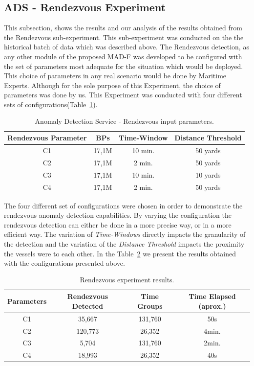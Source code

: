 \subsection{ADS - Rendezvous Experiment}
\label{subsection: ADS - Rendezvous Experiment}
This subsection, shows the results and our analysis of the results obtained from the Rendezvous sub-experiment. This sub-experiment was conducted on the the historical batch of data which was described above. The Rendezvous detection, as any other module of the proposed MAD-F was developed to be configured with the set of parameters most adequate for the situation which would be deployed. This choice of parameters in any real scenario would be done by Maritime Experts. Although for the sole purpose of this Experiment, the choice of parameters was done by us. This Experiment was conducted with four different sets of configurations(Table~\ref{Table: 5 ADS Rendezvous input paramenters}).

\begin{table}[H]
\centering
\caption{Anomaly Detection Service - Rendezvous input parameters.}
\label{Table: 5 ADS Rendezvous input paramenters}
\begin{tabular}{@{}cccc@{}}
\toprule
Rendezvous Parameter & BPs & Time-Window & Distance Threshold \\ \midrule
C1 & 17,1M & 10 min. & 50 yards \\
C2 & 17,1M & 2 min. & 50 yards \\
C3 & 17,1M & 10 min. & 10 yards \\
C4 & 17,1M & 2 min. & 50 yards \\ \bottomrule
\end{tabular}
\end{table}

The four different set of configurations were chosen in order to demonstrate the rendezvous anomaly detection capabilities. By varying the configuration the rendezvous detection can either be done in a more precise way, or in a more efficient way. The variation of \emph{Time-Windows} directly impacts the granularity of the detection and the variation of the \emph{Distance Threshold} impacts the proximity the vessels were to each other. In the Table~\ref{Table: 5 ADS Rendezvous results} we present the results obtained with the configurations presented above.

\begin{table}[H]
\centering
\caption{Rendezvous experiment results. }
\label{Table: 5 ADS Rendezvous results}
\begin{tabular}{@{}cccc@{}}
\toprule
Parameters & Rendezvous Detected & Time Groups & Time Elapsed (aprox.) \\ \midrule
C1 & 35,667 & 131,760 & 50s \\
C2 & 120,773 & 26,352 & 4min. \\
C3 & 5,704 & 131,760 & 2min. \\
C4 & 18,993 & 26,352 & 40s \\ \bottomrule
\end{tabular}
\end{table}

